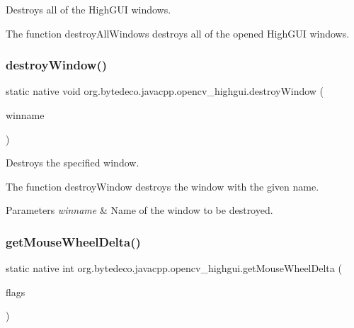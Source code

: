 Destroys all of the High\+G\+UI windows. 

The function destroy\+All\+Windows destroys all of the opened High\+G\+UI windows. \mbox{\label{group__highgui_ga3fd651e0fd7a9c3d290d4217cdcebbcf}} 
\subsubsection{\texorpdfstring{destroy\+Window()}{destroyWindow()}}
{\footnotesize\ttfamily static native void org.\+bytedeco.\+javacpp.\+opencv\+\_\+highgui.\+destroy\+Window (\begin{DoxyParamCaption}\item[{@Str Byte\+Pointer}]{winname }\end{DoxyParamCaption})\hspace{0.3cm}{\ttfamily [static]}}



Destroys the specified window. 

The function destroy\+Window destroys the window with the given name. 


\begin{DoxyParams}{Parameters}
{\em winname} & Name of the window to be destroyed. \\
\hline
\end{DoxyParams}
\mbox{\label{group__highgui_gaf78c2cffa388987b42b78f0c122e5ef9}} 
\subsubsection{\texorpdfstring{get\+Mouse\+Wheel\+Delta()}{getMouseWheelDelta()}}
{\footnotesize\ttfamily static native int org.\+bytedeco.\+javacpp.\+opencv\+\_\+highgui.\+get\+Mouse\+Wheel\+Delta (\begin{DoxyParamCaption}\item[{int}]{flags }\end{DoxyParamCaption})\hspace{0.3cm}{\ttfamily [static]}}



